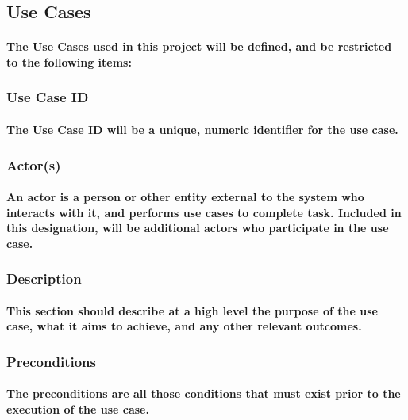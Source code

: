 
\subsection{Use Cases}
\paragraph{The Use Cases used in this project will be defined, and be restricted to the following items:}
\subsubsection{Use Case ID}
\paragraph{The Use Case ID will be a unique, numeric identifier for the use case.}

\subsubsection{Actor(s)}
\paragraph{An actor is a person or other entity external to the system who interacts with it, and performs use cases to complete task. Included in this designation, will be additional actors who participate in the use case.}

\subsubsection{Description}
\paragraph{This section should describe at a high level the purpose of the use case, what it aims to achieve, and any other relevant outcomes.}

\subsubsection{Preconditions}
\paragraph{The preconditions are all those conditions that must exist prior to the execution of the use case.}


